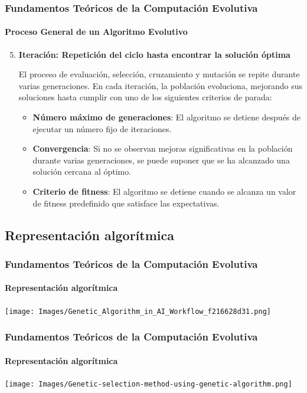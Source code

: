 \documentclass[
	11pt, %
]{beamer}
\begin{document}
\begin{frame}
    \frametitle{Fundamentos Teóricos de la Computación Evolutiva}
    \framesubtitle{Proceso General de un Algoritmo Evolutivo}
    \begin{enumerate}
    \setcounter{enumi}{4}
        \item \textbf{Iteración: Repetición del ciclo hasta encontrar la solución óptima}
        
        El proceso de evaluación, selección, cruzamiento y mutación se repite durante varias generaciones. En cada iteración, la población evoluciona, mejorando sus soluciones hasta cumplir con uno de los siguientes criterios de parada:
        
        \begin{itemize}
            \item \textbf{Número máximo de generaciones}: El algoritmo se detiene después de ejecutar un número fijo de iteraciones.
            \item \textbf{Convergencia}: Si no se observan mejoras significativas en la población durante varias generaciones, se puede suponer que se ha alcanzado una solución cercana al óptimo.
            \item \textbf{Criterio de fitness}: El algoritmo se detiene cuando se alcanza un valor de fitness predefinido que satisface las expectativas.
        \end{itemize}
    \end{enumerate}
\end{frame}

\subsection{Representación algorítmica}
\begin{frame}
	\frametitle{Fundamentos Teóricos de la Computación Evolutiva}
	\framesubtitle{Representación algorítmica}
        \begin{center}
            \texttt{[image: Images/Genetic\_Algorithm\_in\_AI\_Workflow\_f216628d31.png]}
        \end{center}
\end{frame}

\begin{frame}
	\frametitle{Fundamentos Teóricos de la Computación Evolutiva}
	\framesubtitle{Representación algorítmica}
        \begin{center}
            \texttt{[image: Images/Genetic-selection-method-using-genetic-algorithm.png]}
        \end{center}
\end{frame}
\end{document}
